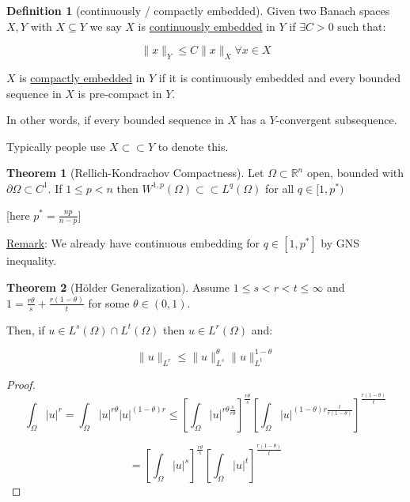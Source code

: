 \documentclass{article}
\theoremstyle{definition}
\newtheorem{definition}{Definition}
\newtheorem{theorem}{Theorem}
\begin{document}
\begin{definition}[continuously / compactly embedded]
    Given two Banach spaces \(X,Y\) with \(X \subseteq Y\) we say \(X\) is \underline{continuously embedded} in \(Y\) if \(\exists C > 0\) such that:

    \[
        \lVert x \rVert _ Y \leq C \lVert x \rVert _ X \forall x\in X
    \]

    \(X\) is \underline{compactly embedded} in \(Y\) if it is continuously embedded and every bounded sequence in \(X\) is pre-compact in \(Y\).

    In other words, if every bounded sequence in \(X\) has a \(Y\)-convergent subsequence.

    Typically people use \(X \subset \subset Y\) to denote this.
\end{definition}

\begin{theorem}
    [Rellich-Kondrachov Compactness]

    Let \(\Omega \subset \mathbb{R} ^n\) open, bounded with \(\partial \Omega \subset C^1\). If \(1 \leq p < n\) then \(W^{1,p}(\Omega) \subset \subset L^q(\Omega)\) for all \(q\in[1,p^{\ast})\) 

    [here \(p^{\ast} = \frac{np}{n-p}\)]
\end{theorem}

\underline{Remark}: We already have continuous embedding for \(q\in [1,p^{\ast}]\) by GNS inequality.

\begin{theorem}
    [H\"older Generalization]

    Assume \(1 \leq s < r < t \leq \infty\) and \(1 = \frac{r \theta}{s} + \frac{r(1-\theta)}{t}\) for some \(\theta \in (0,1)\). 
    
    Then, if \(u\in L^s(\Omega)\cap L^t(\Omega)\) then \(u\in L^r(\Omega)\) and:

    \[
        \lVert u \rVert _{L^r} \leq \lVert u \rVert ^\theta _{L^s} \lVert u \rVert ^{1-\theta}_{L^t}
    \]
\end{theorem}

\begin{proof}
    \[
        \int _ \Omega \vert u \vert ^ r = \int _ \Omega \vert u \vert ^{r \theta} \vert u \vert ^{(1-\theta)r} \leq \left[ \int _\Omega \vert u \vert ^{{r \theta}\frac{s}{r \theta}} \right]^{\frac{r \theta}{s}} \left[ \int _ \Omega \vert u \vert ^{(1-\theta)r \frac{t}{r(1-\theta)}} \right]^{\frac{r(1-\theta)}{t}}
    \]
    
    \[
        = \left[ \int _ \Omega \vert u \vert ^ s \right]^{\frac{r \theta}{s}} \left[ \int _ \Omega \vert u \vert ^{t} \right] ^{\frac{r(1-\theta)}{t}}
    \]
\end{proof}
\end{document}
